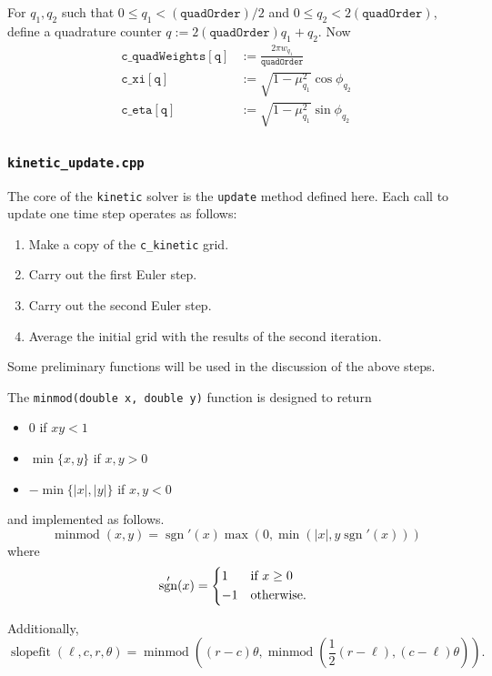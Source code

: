 \documentclass{article}
\newcommand{\quadorder}{\ensuremath{\mathtt{quadOrder}}\xspace}
\newcommand{\assign}{\ensuremath{\mathrel{\texttt{:=}}}}
\DeclareMathOperator{\minmod}{minmod}
\DeclareMathOperator{\slopefit}{slopefit}
\DeclareMathOperator{\sgn}{sgn}
\newcommand{\kinetic}{\texttt{kinetic}\xspace}
\begin{document}
For $q_1,q_2$ such that $0 \leq q_1 < (\quadorder) / 2$ and
$0 \leq q_2 < 2(\quadorder)$, define a quadrature counter
$q \assign 2(\quadorder)q_1 + q_2$. Now 
\begin{align}
    \mathtt{c\_quadWeights[q]} &\assign \frac{2\pi w_{q_1}}{\quadorder} \\
    \mathtt{c\_xi[q]} &\assign \sqrt{1 - \mu_{q_1}^2} \cos \phi_{q_2} \\
    \mathtt{c\_eta[q]} &\assign \sqrt{1 - \mu_{q_1}^2} \sin \phi_{q_2}
\end{align}

\subsubsection{\texttt{kinetic\_update.cpp}}
\label{src:kinetic_update.cpp}
The core of the \kinetic solver is the \texttt{update} method defined here. Each
call to update one time step operates as follows:
\begin{enumerate}
    \item Make a copy of the \texttt{c\_kinetic} grid.
    \item Carry out the first Euler step.
    \item Carry out the second Euler step.
    \item Average the initial grid with the results of the second iteration.
\end{enumerate}
Some preliminary functions will be used in the discussion of the above steps.

The \texttt{minmod(double x, double y)} function is designed to return
\begin{itemize}
    \item 0 if $xy < 1$
    \item $\min\{x, y\}$ if $x,y > 0$
    \item $-\min\{|x|, |y|\}$ if $x,y < 0$
\end{itemize}
and implemented as follows.
\begin{equation}
    \minmod (x, y) = \sgn'(x) \max\left(0, \min\left(|x|, y \sgn'(x)\right)\right)
\end{equation}
where
\begin{equation}
    \sgn'(x) =
    \begin{dcases*}
        1  & if $x \geq 0$ \\
        -1 & otherwise.
    \end{dcases*}
\end{equation}

Additionally,
\begin{equation}
    \slopefit(\ell, c, r, \theta) = \minmod\left((r - c)\theta,
        \minmod\left(\frac{1}{2}(r - \ell), (c-\ell)\theta\right)\right).
\end{equation}
\end{document}

